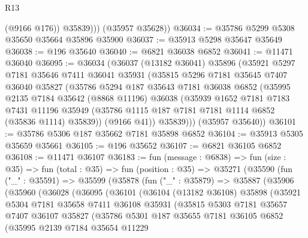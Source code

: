 \begin{lexlean}{R13}
\begin{coremodule}
              (@9166 @176))
            @35839)))
      (@35957 @35628))
@36034 := @35786 @5299 @5308 @35650 @35664 @35896 @35900
@36037 := @35913 @5298 @35647 @35649
@36038 := @196 @35640
@36040 := @6821 @36038 @6852
@36041 := @11471 @36040
@36095 := @36034
    (@36037
      (@13182 @36041)
      @35896
      (@35921
        @5297
        @7181
        @35646
        @7411
        @36041
        @35931
        (@35815
          @5296
          @7181
          @35645
          @7407
          @36040
          @35827
          (@35786
            @5294
            @187
            @35643
            @7181
            @36038
            @6852
            (@35995
              @2135
              @7184
              @35642
              (@8868 @11196)
              @36038
              (@35939
                @1652
                @7181
                @7183
                @7431
                @11196
                @35949
                (@35786 @1115 @187 @7181 @7181 @1114 @6852 (@35836 @1114) @35839))
              (@9166 @41))
            @35839)))
      (@35957 @35640))
@36101 := @35786 @5306 @187 @35662 @7181 @35898 @6852
@36104 := @35913 @5305 @35659 @35661
@36105 := @196 @35652
@36107 := @6821 @36105 @6852
@36108 := @11471 @36107
@36183 := fun (message : @6838) =>
  fun (size : @35) =>
  fun (total : @35) =>
  fun (position : @35) =>
  @35271
    (@35590
      (fun ("_" : @35591) =>
      @35599
        (@35878
          (fun ("_" : @35879) =>
          @35887
            (@35906
              (@35960
                (@36028
                  (@36095
                    (@36101
                      (@36104
                        (@13182 @36108)
                        @35898
                        (@35921
                          @5304
                          @7181
                          @35658
                          @7411
                          @36108
                          @35931
                          (@35815
                            @5303
                            @7181
                            @35657
                            @7407
                            @36107
                            @35827
                            (@35786
                              @5301
                              @187
                              @35655
                              @7181
                              @36105
                              @6852
                              (@35995
                                @2139
                                @7184
                                @35654
                                @11229

\end{coremodule}
\end{lexlean}
